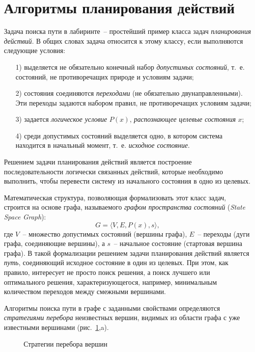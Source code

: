 \documentclass[a4paper,14pt, openany, twoside, final]{extbook} %
\newcommand{\eeng}[1]{\emph{\foreignlanguage{english}{#1}}}
\begin{document}
\section{Алгоритмы планирования действий}
\label{sec:problemsolving}

Задача поиска пути в лабиринте~-- простейший пример класса задач \emph{планирования действий}.  В общих словах задача относится к этому классу, если выполняются следующие условия:
\begin{enumerate}
\item[1)] выделяется не обязательно конечный набор \emph{допустимых состояний}, т.~е. состояний, не противоречащих природе и условиям задачи;
\item[2)] состояния соединяются \emph{переходами} (не обязательно двунаправленными). Эти переходы задаются набором правил, не противоречащих условиям задачи;
\item[3)] задается \emph{логическое условие} $P(x)$, \emph{распознающее целевые состояния} $x$;
\item[4)] среди допустимых состояний выделяется одно, в котором система находится в начальный момент, т.~е. \emph{исходное состояние}.
\end{enumerate}
Решением задачи планирования действий является построение последовательности логически связанных действий, которые необходимо выполнить, чтобы перевести систему из начального состояния в одно из целевых.

Математическая структура, позволяющая формализовать этот класс задач, строится на основе графа, называемого \emph{графом пространства состояний} (\eeng{State Space Graph}):
$$
G=\langle V,E, P(x), s\rangle,
$$
где $V$~-- множество допустимых состояний (вершины графа), $E$~-- переходы (дуги графа, соединяющие вершины), а $s$~-- начальное состояние (стартовая вершина графа).  В такой формализации решением задачи планирования действий является \emph{путь}, соединяющий исходное состояние в один из целевых.  При этом, как правило, интересует не просто поиск решения, а поиск лучшего или оптимального решения, характеризующегося, например, минимальным количеством переходов между смежными вершинами.

Алгоритмы поиска пути в графе с заданными свойствами определяются \emph{стратегиями перебора} неизвестных вершин, видимых из области графа с уже известными вершинами (рис.~\ref{fig:searchdescr},a).
\begin{figure}[hbtp]
  \centering
  \def\svgwidth{\columnwidth}
  \footnotesize\itshape
  \def\zb{\normalsize $D$}
  \def\ya{\footnotesize\it a)}
  \def\yb{\footnotesize\it b)}
  \def\yc{\footnotesize\it c)}
  
  \caption{Стратегии перебора вершин}
  \label{fig:searchdescr}
\end{figure}
\end{document}

